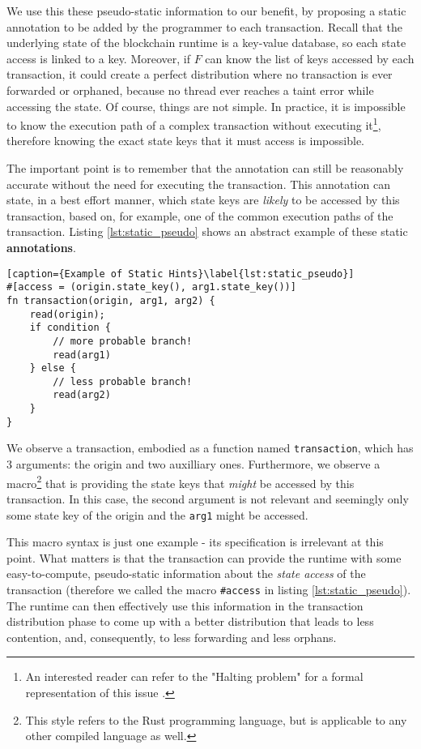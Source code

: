 We use this these pseudo-static information to our benefit, by proposing a static annotation to be added by the programmer
to each transaction. Recall that the underlying state of the blockchain runtime is a key-value
database, so each state access is linked to a key. Moreover, if $F$ can know the list of keys
accessed by each transaction, it could create a perfect distribution where no transaction is ever
forwarded or orphaned, because no thread ever reaches a taint error while accessing the state. Of
course, things are not simple. In practice, it is impossible to know the execution path of a complex
transaction without executing it\footnote{An interested reader can refer to the "Halting problem"
for a formal representation of this issue \cite{burkholderHaltingProblem1987}.}, therefore knowing
the exact state keys that it must access is impossible.

The important point is to remember that the annotation can still be reasonably accurate without the
need for executing the transaction. This annotation can state, in a best effort manner, which state
keys are \textit{likely} to be accessed by this transaction, based on, for example, one of the
common execution paths of the transaction. Listing \ref{lst:static_pseudo} shows an abstract example of these static \textbf{annotations}.

\begin{lstlisting}[caption={Example of Static Hints}\label{lst:static_pseudo}]
#[access = (origin.state_key(), arg1.state_key())]
fn transaction(origin, arg1, arg2) {
	read(origin);
	if condition {
		// more probable branch!
		read(arg1)
	} else {
		// less probable branch!
		read(arg2)
	}
}
\end{lstlisting}

We observe a transaction, embodied as a function named \texttt{transaction}, which has 3 arguments:
the origin and two auxilliary ones. Furthermore, we observe a macro\footnote{This style refers to the
Rust programming language, but is applicable to any other compiled language as well.} that is
providing the state keys that \textit{might} be accessed by this transaction. In this case, the
second argument is not relevant and seemingly only some state key of the origin and the
\texttt{arg1} might be accessed.

This macro syntax is just one example - its specification is irrelevant at this point. What matters is that the transaction can provide the runtime with some easy-to-compute, pseudo-static
information about the \textit{state access} of the transaction (therefore we called the macro
\texttt{\#access} in listing \ref{lst:static_pseudo}). The runtime can then effectively use this
information in the transaction distribution phase to come up with a better distribution that leads
to less contention, and, consequently, to less forwarding and less orphans.


